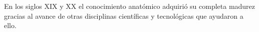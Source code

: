 
En los siglos XIX y XX el conocimiento anatómico adquirió su completa madurez gracias al avance de otras disciplinas científicas y tecnológicas que ayudaron a ello.
